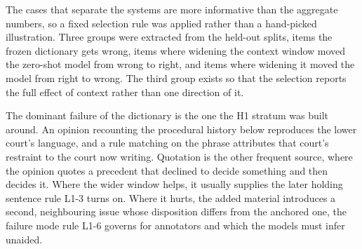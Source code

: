 The cases that separate the systems are more informative than the aggregate
numbers, so a fixed selection rule was applied rather than a hand-picked
illustration. Three groups were extracted from the held-out splits, items the
frozen dictionary gets wrong, items where widening the context window moved the
zero-shot model from wrong to right, and items where widening it moved the model
from right to wrong. The third group exists so that the selection reports the full
effect of context rather than one direction of it.



The dominant failure of the dictionary is the one the H1 stratum was built around.
An opinion recounting the procedural history below reproduces the lower court's
language, and a rule matching on the phrase attributes that court's restraint to
the court now writing. Quotation is the other frequent source, where the opinion
quotes a precedent that declined to decide something and then decides it. Where
the wider window helps, it usually supplies the later holding sentence rule L1-3
turns on. Where it hurts, the added material introduces a second, neighbouring
issue whose disposition differs from the anchored one, the failure mode rule L1-6
governs for annotators and which the models must infer unaided.
